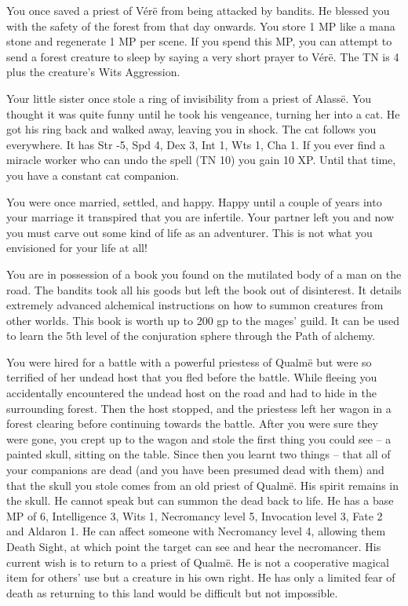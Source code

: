 \begin{multicols}{2}
\begin{list}{\addtocounter{list}{1}\textbf{:}}{\raggedleft}
\item{You once saved a priest of V\'{e}r\"{e} from being attacked by bandits.  He blessed you with the safety of the forest from that day onwards.  You store 1 MP like a mana stone and regenerate 1 MP per scene.  If you spend this MP, you can attempt to send a forest creature to sleep by saying a very short prayer to V\'{e}r\"{e}.  The TN is 4 plus the creature's Wits  Aggression.}

\item{Your little sister once stole a ring of invisibility from a priest of Alass\"{e}.  You thought it was quite funny until he took his vengeance, turning her into a cat.  He got his ring back and walked away, leaving you in shock.  The cat follows you everywhere.  It has Str -5, Spd 4, Dex 3, Int 1, Wts 1, Cha 1.  If you ever find a miracle worker who can undo the spell (TN 10) you gain 10 XP.  Until that time, you have a constant cat companion.}

\item{You were once married, settled, and happy.  Happy until a couple of years into your marriage it transpired that you are infertile.  Your partner left you and now you must carve out some kind of life as an adventurer.  This is not what you envisioned for your life at all!}

\item{You are in possession of a book you found on the mutilated body of a man on the road.  The bandits took all his goods but left the book out of disinterest.  It details extremely advanced alchemical instructions on how to summon creatures from other worlds.  This book is worth up to 200 gp to the mages' guild.  It can be used to learn the 5th level of the conjuration sphere through the Path of alchemy.}

\item{You were hired for a battle with a powerful priestess of Qualm\"{e} but were so terrified of her undead host that you fled before the battle.  While fleeing you accidentally encountered the undead host on the road and had to hide in the surrounding forest.  Then the host stopped, and the priestess left her wagon in a forest clearing before continuing towards the battle. After you were sure they were gone, you crept up to the wagon and stole the first thing you could see -- a painted skull, sitting on the table.  Since then you learnt two things -- that all of your companions are dead (and you have been presumed dead with them) and that the skull you stole comes from an old priest of Qualm\"{e}.  His spirit remains in the skull.  He cannot speak but can summon the dead back to life.  He has a base MP of 6, Intelligence 3, Wits 1, Necromancy level 5, Invocation level 3, Fate 2 and Aldaron 1.  He can affect someone with Necromancy level 4, allowing them Death Sight, at which point the target can see and hear the necromancer.  His current wish is to return to a priest of Qualm\"{e}.  He is not a cooperative magical item for others' use but a creature in his own right.  He has only a limited fear of death as returning to this land would be difficult but not impossible.}


\end{list}
\end{multicols}
